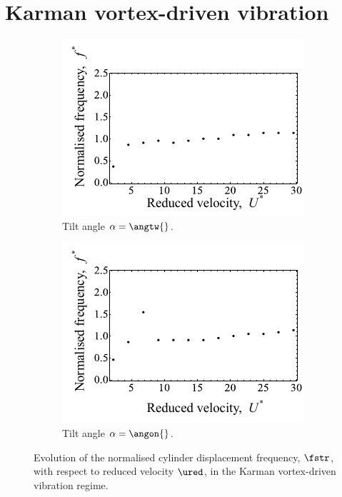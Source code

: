 \documentclass[a4paper,fleqn]{cas-sc}
\begin{document}
\section{Karman vortex-driven vibration}\label{sec:enhKarmanRegime}

\begin{figure}
  \centering
  \begin{subfigure}[h]{0.35\textwidth}
    \includegraphics[width=\textwidth]{figs/yStrFreq2}
    \caption{Tilt angle $\alpha = \angtw{}$.}
    \label{fig:yStrFreq2}
  \end{subfigure}

  \begin{subfigure}[h]{0.35\textwidth}
    \includegraphics[width=\textwidth]{figs/yStrFreq1}
    \caption{Tilt angle $\alpha = \angon{}$.}
    \label{fig:yStrFreq1}
  \end{subfigure}
  \caption{Evolution of the normalised cylinder displacement frequency, $\fstr$, with respect to reduced velocity $\ured$, in the Karman vortex-driven vibration regime.} \label{fig:yStrFreqKarman}
\end{figure}
\end{document}
